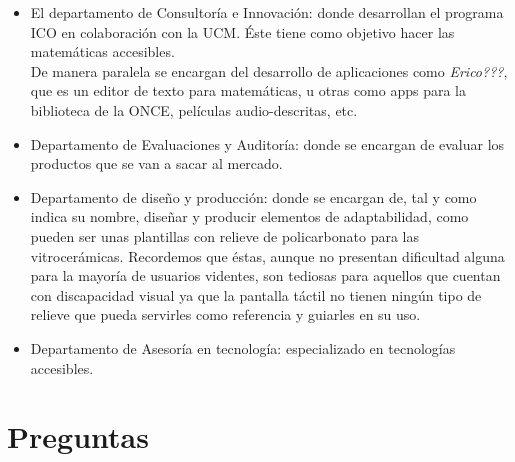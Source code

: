 \documentclass{article}
\begin{document}
	\begin{itemize}
		\item El departamento de Consultoría e Innovación: donde desarrollan el programa ICO en colaboración con la UCM. Éste tiene como objetivo hacer las matemáticas accesibles. 
		\\
		De manera paralela se encargan del desarrollo de aplicaciones como \textit{Erico???}, que es un editor de texto para matemáticas, u otras como apps para la biblioteca de la ONCE, películas audio-descritas, etc.
		\item Departamento de Evaluaciones y Auditoría: donde se encargan de evaluar los productos que se van a sacar al mercado.
		\item Departamento de diseño y producción: donde se encargan de, tal y como indica su nombre, diseñar y producir elementos de adaptabilidad, como pueden ser unas plantillas con relieve de policarbonato para las vitrocerámicas. Recordemos que éstas, aunque no presentan dificultad alguna para la mayoría de usuarios videntes, son tediosas para aquellos que cuentan con discapacidad visual ya que la pantalla táctil no tienen ningún tipo de relieve que pueda servirles como referencia y guiarles en su uso.
		\item Departamento de Asesoría en tecnología: especializado en tecnologías accesibles.
	\end{itemize}


	\section{Preguntas}
\end{document}

